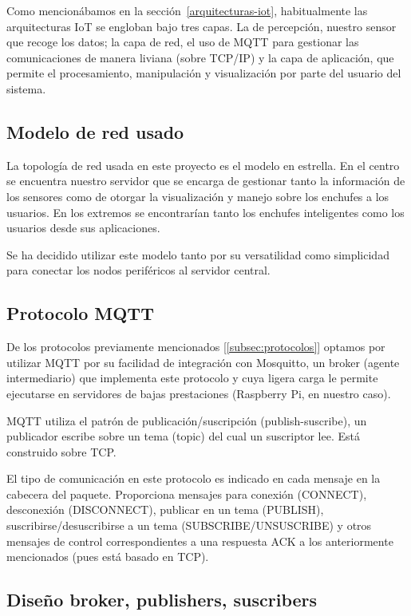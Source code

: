 \documentclass[a4paper,10pt]{article}
\begin{document}
Como mencionábamos en la sección~\ref{arquitecturas-iot},
habitualmente las arquitecturas IoT se engloban bajo tres capas. La de
percepción, nuestro sensor que recoge los datos; la capa de red, el
uso de MQTT para gestionar las comunicaciones de manera liviana (sobre
TCP/IP) y la capa de aplicación, que permite el procesamiento,
manipulación y visualización por parte del usuario del sistema.

\subsection{Modelo de red usado}\label{modelo-de-red-usado}

La topología de red usada en este proyecto es el modelo en
estrella. En el centro se encuentra nuestro servidor que se encarga de
gestionar tanto la información de los sensores como de otorgar la
visualización y manejo sobre los enchufes a los usuarios. En los
extremos se encontrarían tanto los enchufes inteligentes como los
usuarios desde sus aplicaciones.

Se ha decidido utilizar este modelo tanto por su versatilidad como
simplicidad para conectar los nodos periféricos al servidor central.

\subsection{Protocolo MQTT}\label{protocolo-mqtt}

De los protocolos previamente mencionados [\ref{subsec:protocolos}]
optamos por utilizar MQTT por su facilidad de integración con
Mosquitto, un broker (agente intermediario) que implementa este
protocolo y cuya ligera carga le permite ejecutarse en servidores de
bajas prestaciones (Raspberry Pi, en nuestro caso).

MQTT utiliza el patrón de publicación/suscripción (publish-suscribe),
un publicador escribe sobre un tema (topic) del cual un suscriptor
lee. Está construido sobre TCP.

El tipo de comunicación en este protocolo es indicado en cada mensaje
en la cabecera del paquete. Proporciona mensajes para conexión
(CONNECT), desconexión (DISCONNECT), publicar en un tema (PUBLISH),
suscribirse/desuscribirse a un tema (SUBSCRIBE/UNSUSCRIBE) y otros
mensajes de control correspondientes a una respuesta ACK a los
anteriormente mencionados (pues está basado en
TCP).\cite{banksMQTTVersionEdited}

\subsection{Diseño broker, publishers,
suscribers}\label{diseuxf1o-broker-publishers-suscribers}
\end{document}
